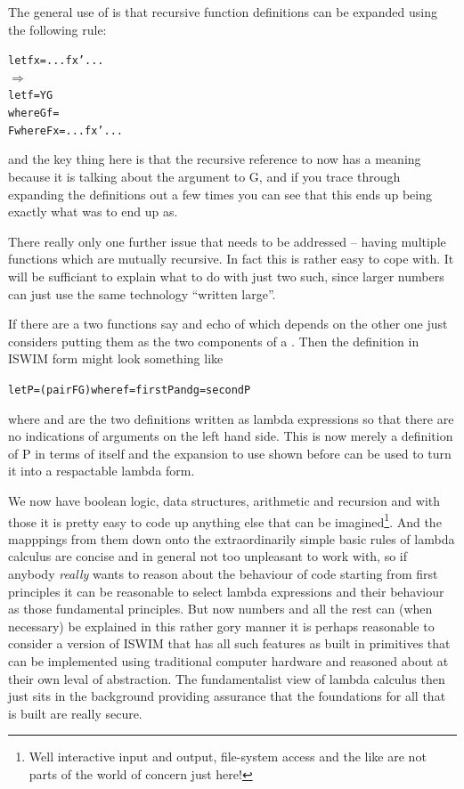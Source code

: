 The general use of \verb@Y@ is that recursive function definitions can be
expanded using the following rule:
\begin{alltt}
  let f x = ... f x' ...
\(\Longrightarrow\)
  let f = Y G
    where G f =
      F where F x = ... f x' ...
\end{alltt}
and the key thing here is that the recursive reference to \verb@f@ now
has a meaning because it is talking about the argument to G, and if you
trace through expanding the definitions out a few times you can see that
this ends up being exactly what \verb@f@ was to end up as.

There really only one further issue that needs to be addressed -- having
multiple functions which are mutually recursive. In fact this is
rather easy to cope with. It will be sufficiant to explain what to do
with just two such, since larger numbers can just use the same technology
``written large''.

If there are a two functions say \verb@f@ and \verb@g@ echo of which
depends on the other one just considers putting them as the
two components of a \verb@pair@. Then the definition in ISWIM form
might look something like
\begin{alltt}
  let P = (pair F G) where f = first P and g = second P
\end{alltt}
where \verb@F@ and \verb@G@ are the two definitions written as
lambda expressions so that there are no indications of arguments on the
left hand side. This is now merely a definition of P in terms of itself
and the expansion to use \verb@Y@ shown before can be used to turn it
into a respactable lambda form. 

We now have boolean logic, data structures, arithmetic and recursion and
with those it is pretty easy to code up anything else that can be
imagined\footnote{Well interactive input and output, file-system access and
the like are not parts of the world of concern just here!}. And the
mapppings from them down onto the extraordinarily simple basic rules
of lambda calculus are concise and in general not too unpleasant to work with,
so if anybody {\em really} wants to reason about the behaviour of code
starting from first principles it can be reasonable to select lambda
expressions and their behaviour as those fundamental principles. But
now numbers and all the rest can (when necessary) be explained in this
rather gory manner it is perhaps reasonable to consider a version of
ISWIM that has all such features as built in primitives that can be
implemented using traditional computer hardware and reasoned about at their
own leval of abstraction. The fundamentalist view of lambda calculus then
just sits in the background providing assurance that the foundations for
all that is built are really secure.

